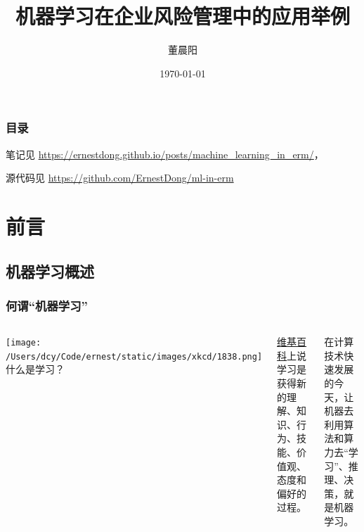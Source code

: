 \documentclass{ctexbeamer}
\author{董晨阳}
\date{\today}
\title{机器学习在企业风险管理中的应用举例}
\begin{document}
\maketitle
\begin{frame}
    \frametitle{目录}
    \tableofcontents[hideallsubsections]
    \small 笔记见 \url{https://ernestdong.github.io/posts/machine_learning_in_erm/}，

    \small 源代码见 \url{https://github.com/ErnestDong/ml-in-erm}
\end{frame}

\section{前言}
\subsection{机器学习概述}
\begin{frame}
    \frametitle{何谓“机器学习”}
    \begin{columns}
        \texttt{[image: /Users/dcy/Code/ernest/static/images/xkcd/1838.png]}
        什么是学习？

        \href{https://zh.wikipedia.org/wiki/\%E5\%AD\%A6\%E4\%B9\%A0}{维基百科}上说学习是获得新的理解、知识、行为、技能、价值观、态度和偏好的过程。

        在计算技术快速发展的今天，让机器去利用算法和算力去“学习”、推理、决策，就是机器学习。
    \end{columns}
\end{frame}
\end{document}
